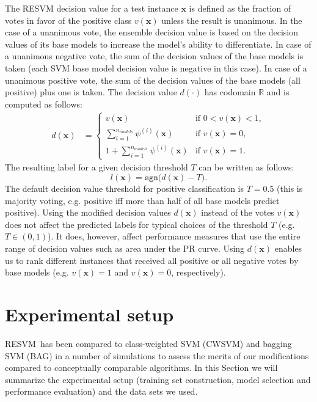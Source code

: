 \documentclass[preprint,elsarticle-num,12pt]{elsarticle}
\newcommand{\resvm}{RESVM}
\begin{document}
The RESVM decision value for a test instance $\mathbf{x}$ is defined as the fraction of votes in favor of the positive class $v(\mathbf{x})$ unless the result is unanimous. In the case of a unanimous vote, the ensemble decision value is based on the decision values of its base models to increase the model's ability to differentiate. In case of a unanimous negative vote, the sum of the decision values of the base models is taken (each SVM base model decision value is negative in this case). In case of a unanimous positive vote, the sum of the decision values of the base models (all positive) plus one is taken.
The decision value $d(\cdot)$ has codomain $\mathbb{R}$ and is computed as follows:
\begin{align}
d(\mathbf{x}) &= \left\{ \begin{array}{ll}
v(\mathbf{x}) & \text{if } 0 < v(\mathbf{x}) < 1, \\
\sum_{i=1}^{n_{models}} \psi^{(i)}(\mathbf{x}) & \text{if } v(\mathbf{x}) = 0, \\
1+\sum_{i=1}^{n_{models}} \psi^{(i)}(\mathbf{x}) & \text{if } v(\mathbf{x}) = 1.
\end{array}\right. \label{eq:resvmdecval}
\end{align}
The resulting label for a given decision threshold $T$ can be written as follows:
\begin{equation}
l(\mathbf{x}) = \mathtt{sgn}\big(d(\mathbf{x})-T\big). \label{eq:resvmlabel}
\end{equation}
The default decision value threshold for positive classification is $T=0.5$ (this is majority voting, e.g. positive iff more than half of all base models predict positive). Using the modified decision values $d(\mathbf{x})$ instead of the votes $v(\mathbf{x})$ does not affect the predicted labels for typical choices of the threshold $T$ (e.g. $T \in (0, 1)$). It does, however, affect performance measures that use the entire range of decision values such as area under the PR curve. Using $d(\mathbf{x})$ enables us to rank different instances that received all positive or all negative votes by base models (e.g. $v(\mathbf{x})=1$ and $v(\mathbf{x})=0$, respectively).


\section{Experimental setup}
\resvm\ has been compared to class-weighted SVM (CWSVM) and bagging SVM (BAG) in a number of simulations to assess the merits of our modifications compared to conceptually comparable algorithms. In this Section we will summarize the experimental setup (training set construction, model selection and performance evaluation) and the data sets we used. 
\end{document}
